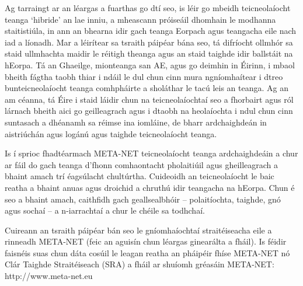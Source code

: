 \begin{multicols}{2}

Ag tarraingt ar an léargas a fuarthas go dtí seo, is léir go mbeidh teicneolaíocht teanga ‘hibride’ an lae inniu, a mheascann próiseáil dhomhain le modhanna staitistiúla, in ann an bhearna idir gach teanga Eorpach agus teangacha eile nach iad a líonadh. Mar a léirítear sa tsraith páipéar bána seo, tá difríocht ollmhór sa staid ullmhachta maidir le réitigh theanga agus an staid taighde idir ballstáit na hEorpa. Tá an Ghaeilge, mionteanga san AE, agus go deimhin in Éirinn, i mbaol bheith fágtha taobh thiar i ndáil le dul chun cinn mura ngníomhaítear i dtreo bunteicneolaíocht teanga comhpháirte a sholáthar le tacú leis an teanga. Ag an am céanna, tá Éire i staid láidir chun na teicneolaíochtaí seo a fhorbairt agus ról lárnach bheith aici go geilleagrach agus i dtaobh na heolaíochta i ndul chun cinn suntasach a dhéanamh sa réimse ina iomláine, de bharr ardchaighdeán in aistriúchán agus logánú agus taighde teicneolaíocht teanga. 

Is í sprioc fhadtéarmach META-NET teicneolaíocht teanga ardchaighdeáin a chur ar fáil do gach teanga d’fhonn comhaontacht pholaitiúil agus gheilleagrach a bhaint amach trí éagsúlacht chultúrtha. Cuideoidh an teicneolaíocht le baic reatha a bhaint anuas agus droichid a chruthú idir teangacha na hEorpa. Chun é seo a bhaint amach, caithfidh gach geallsealbhóir – polaitíochta, taighde, gnó agus sochaí – a n-iarrachtaí a chur le chéile sa todhchaí.

Cuireann an tsraith páipéar bán seo le gníomhaíochtaí straitéiseacha eile a rinneadh META-NET (feic an aguisín chun léargas ginearálta a fháil). Is féidir faisnéis suas chun dáta cosúil le leagan reatha an pháipéir fhíse META-NET \cite{Meta1} nó Clár Taighde Straitéiseach (SRA) a fháil ar shuíomh gréasáin META-NET:  http://www.meta-net.eu

\end{multicols}

\clearpage



